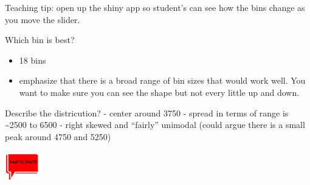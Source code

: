 \documentclass[
  letterpaper,
  DIV=11,
  numbers=noendperiod]{scrreprt}
\providecommand{\tightlist}{%
  \setlength{\itemsep}{0pt}\setlength{\parskip}{0pt}}\usepackage{longtable,booktabs,array}
\begin{document}
\begin{tcolorbox}[enhanced jigsaw, breakable, colback=white, bottomrule=.15mm, leftrule=.75mm, colframe=quarto-callout-important-color-frame, arc=.35mm, rightrule=.15mm, toprule=.15mm, left=2mm, opacityback=0]

Teaching tip: open up the shiny app so student's can see how the bins
change as you move the slider.

Which bin is best?

\begin{itemize}
\tightlist
\item
  18 bins
\item
  emphasize that there is a broad range of bin sizes that would work
  well. You want to make sure you can see the shape but not every little
  up and down.
\end{itemize}

Describe the districution? - center around 3750 - spread in terms of
range is \textasciitilde2500 to 6500 - right skewed and ``fairly''
unimodal (could argue there is a small peak around 4750 and 5250)

\includegraphics[width=\textwidth,height=0.5in]{images/images_lecture/participate_icon.png}

\end{tcolorbox}
\end{document}
